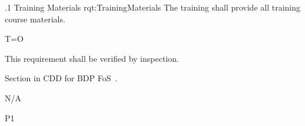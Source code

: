 \ONERQMTV
{\RqtNumberBase.1}
{Training Materials}
{rqt:TrainingMaterials}
{The \ThisSys training shall provide all training course materials.}
{
	\item [Phase 1] T=O
}
{This requirement shall be verified by inspection.}
{
\item [12.3] Section in CDD for BDP FoS~\cite{ref__BDP_FOS_CDD}.
}
{
	\item N/A
}
{P1}

